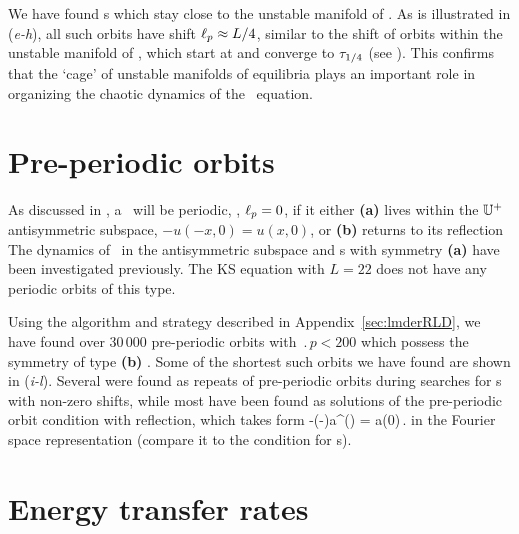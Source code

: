 

We have found \rpo s which stay
close to the unstable manifold of .
As is illustrated in (\textit{e-h}), all such orbits have
shift $\ell_p \approx L/4$, similar to the shift of orbits within
the unstable manifold of , which start at  and
converge to $\tau_{1/4}$ (see ). This
confirms that the `cage' of unstable manifolds of equilibria plays
an important role in organizing the chaotic dynamics of the \KS\
equation.


\section{Pre-periodic orbits} \label{ssec:po}

As discussed in , a \rpo\ will be periodic, \ie,
$\ell_p = 0$, if it either {\bf (a)} lives within the $\mathbb{U}^+$ antisymmetric
subspace, $-u(-x,0) = u(x,0)$, or {\bf (b)}
returns to its reflection 
The dynamics of
\KSe\ in the antisymmetric subspace and \po s with symmetry {\bf (a)} have
been investigated
previously. The KS equation
with $L = 22$ does not have any periodic orbits of this type.

Using the algorithm and strategy described in Appendix~\ref{sec:lmderRLD},
we have found over 30\,000 pre-periodic orbits with $\period{p} < 200$
which possess the symmetry of type {\bf (b)} . Some of the shortest such
orbits we have found are shown in \reffig{f:ks22rpos}(\textit{i-l}).
Several were found as
repeats of pre-periodic orbits during searches
for \rpo s with non-zero shifts,
while most have been
found as solutions of the pre-periodic orbit
condition  with reflection,
which takes form
\beq
 -(-\shift)a^\ast() = a(0)\,.
\label{KSposFour}
\eeq
in the Fourier space representation
(compare it to the condition  for \rpo s).


\section{Energy transfer rates}
\label{sec:energyL22}


